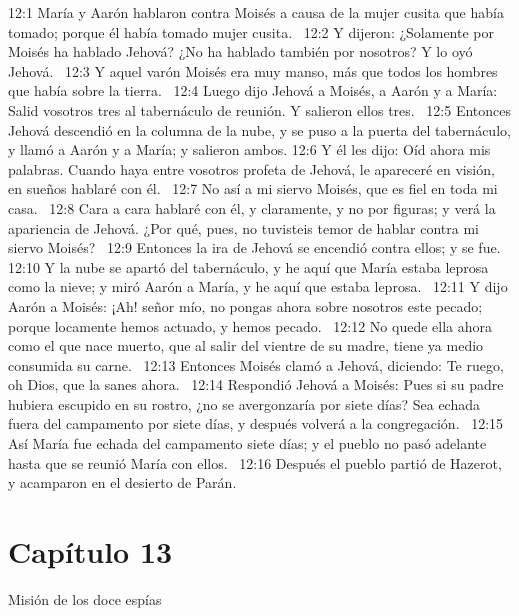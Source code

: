12:1 María y Aarón hablaron contra Moisés a causa de la mujer cusita que había tomado; porque él había tomado mujer cusita.  
12:2 Y dijeron: ¿Solamente por Moisés ha hablado Jehová? ¿No ha hablado también por nosotros? Y lo oyó Jehová.  
12:3 Y aquel varón Moisés era muy manso, más que todos los hombres que había sobre la tierra.  
12:4 Luego dijo Jehová a Moisés, a Aarón y a María: Salid vosotros tres al tabernáculo de reunión. Y salieron ellos tres.  
12:5 Entonces Jehová descendió en la columna de la nube, y se puso a la puerta del tabernáculo, y llamó a Aarón y a María; y salieron ambos. 
12:6 Y él les dijo: Oíd ahora mis palabras. Cuando haya entre vosotros profeta de Jehová, le apareceré en visión, en sueños hablaré con él.  
12:7 No así a mi siervo Moisés, que es fiel en toda mi casa.  
12:8 Cara a cara hablaré con él, y claramente, y no por figuras; y verá la apariencia de Jehová. ¿Por qué, pues, no tuvisteis temor de hablar contra mi siervo Moisés?  
12:9 Entonces la ira de Jehová se encendió contra ellos; y se fue.  
12:10 Y la nube se apartó del tabernáculo, y he aquí que María estaba leprosa como la nieve; y miró Aarón a María, y he aquí que estaba leprosa.  
12:11 Y dijo Aarón a Moisés: ¡Ah! señor mío, no pongas ahora sobre nosotros este pecado; porque locamente hemos actuado, y hemos pecado.  
12:12 No quede ella ahora como el que nace muerto, que al salir del vientre de su madre, tiene ya medio consumida su carne.  
12:13 Entonces Moisés clamó a Jehová, diciendo: Te ruego, oh Dios, que la sanes ahora.  
12:14 Respondió Jehová a Moisés: Pues si su padre hubiera escupido en su rostro, ¿no se avergonzaría por siete días? Sea echada fuera del campamento por siete días, y después volverá a la congregación.  
12:15 Así María fue echada del campamento siete días; y el pueblo no pasó adelante hasta que se reunió María con ellos.  
12:16 Después el pueblo partió de Hazerot, y acamparon en el desierto de Parán.  
\section*{Capítulo 13 }
Misión de los doce espías   

